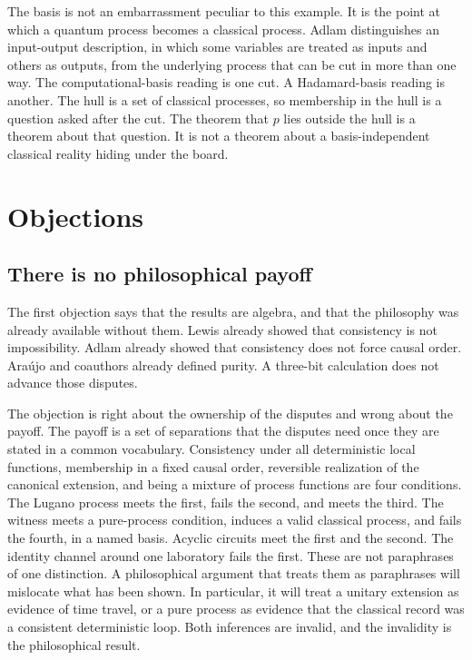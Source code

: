 \documentclass[11pt]{article}
\begin{document}
The basis is not an embarrassment peculiar to this example. It is the point at which a quantum process becomes a classical process. Adlam distinguishes an input-output description, in which some variables are treated as inputs and others as outputs, from the underlying process that can be cut in more than one way. The computational-basis reading is one cut. A Hadamard-basis reading is another. The hull is a set of classical processes, so membership in the hull is a question asked after the cut. The theorem that \(p\) lies outside the hull is a theorem about that question. It is not a theorem about a basis-independent classical reality hiding under the board.

\section{Objections}
\label{sec:obj}

\subsection{There is no philosophical payoff}
\label{sec:payoff}

The first objection says that the results are algebra, and that the philosophy was already available without them. Lewis already showed that consistency is not impossibility. Adlam already showed that consistency does not force causal order. Ara\'ujo and coauthors already defined purity. A three-bit calculation does not advance those disputes.

The objection is right about the ownership of the disputes and wrong about the payoff. The payoff is a set of separations that the disputes need once they are stated in a common vocabulary. Consistency under all deterministic local functions, membership in a fixed causal order, reversible realization of the canonical extension, and being a mixture of process functions are four conditions. The Lugano process meets the first, fails the second, and meets the third. The witness meets a pure-process condition, induces a valid classical process, and fails the fourth, in a named basis. Acyclic circuits meet the first and the second. The identity channel around one laboratory fails the first. These are not paraphrases of one distinction. A philosophical argument that treats them as paraphrases will mislocate what has been shown. In particular, it will treat a unitary extension as evidence of time travel, or a pure process as evidence that the classical record was a consistent deterministic loop. Both inferences are invalid, and the invalidity is the philosophical result.
\end{document}
